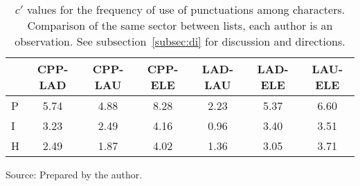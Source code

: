 \begin{table}
  \centering
  \caption{$c'$ values for the frequency of use of punctuations among characters. Comparison of the same sector between lists, each author is an observation. See subsection~\ref{subsec:di} for discussion and directions.}
    \small
\setlength{\tabcolsep}{.06667em}
  \begin{tabular}{|l|| c|c|c|c|c|c|}\hline
 & CPP-LAD & CPP-LAU & CPP-ELE & LAD-LAU & LAD-ELE & LAU-ELE \\\hline
P & 5.74 & 4.88 & 8.28 & 2.23 & 5.37 & 6.60 \\\hline
I & 3.23 & 2.49 & 4.16 & 0.96 & 3.40 & 3.51 \\\hline
H & 2.49 & 1.87 & 4.02 & 1.36 & 3.05 & 3.71 \\\hline
  \end{tabular}
\begin{flushleft}
		Source: Prepared by the author.\
\end{flushleft}
  \label{tab:kolPctInter}
\end{table}
 
